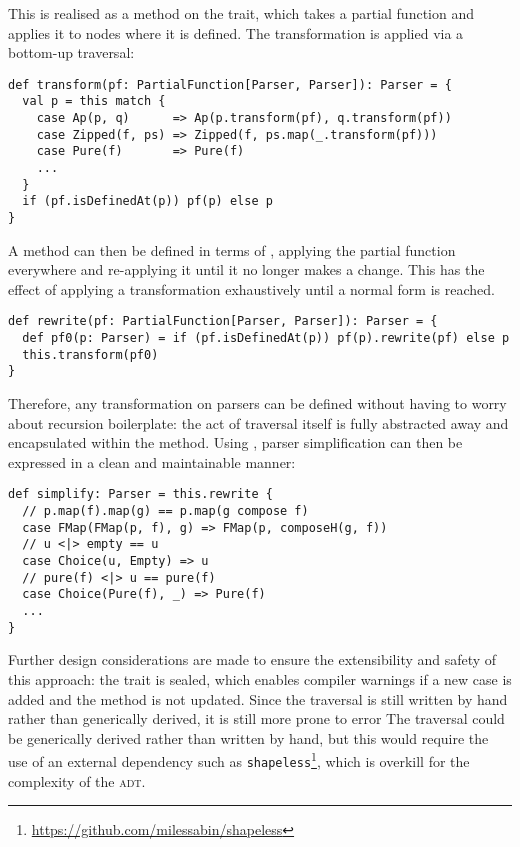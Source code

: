 \documentclass[../../../main.tex]{subfiles}
\begin{document}
This is realised as a  method on the  trait, which takes a partial function and applies it to nodes where it is defined.
The transformation is applied via a bottom-up traversal:
\begin{verbatim}
def transform(pf: PartialFunction[Parser, Parser]): Parser = {
  val p = this match {
    case Ap(p, q)      => Ap(p.transform(pf), q.transform(pf))
    case Zipped(f, ps) => Zipped(f, ps.map(_.transform(pf)))
    case Pure(f)       => Pure(f)
    ...
  }
  if (pf.isDefinedAt(p)) pf(p) else p
}
\end{verbatim}
%
A  method can then be defined in terms of , applying the partial function everywhere and re-applying it until it no longer makes a change.
This has the effect of applying a transformation exhaustively until a normal form is reached.
\begin{verbatim}
def rewrite(pf: PartialFunction[Parser, Parser]): Parser = {
  def pf0(p: Parser) = if (pf.isDefinedAt(p)) pf(p).rewrite(pf) else p
  this.transform(pf0)
}
\end{verbatim}
%
Therefore, any transformation on parsers can be defined without having to worry about recursion boilerplate: the act of traversal itself is fully abstracted away and encapsulated within the  method.
Using , parser simplification can then be expressed in a clean and maintainable manner:
\begin{verbatim}
def simplify: Parser = this.rewrite {
  // p.map(f).map(g) == p.map(g compose f)
  case FMap(FMap(p, f), g) => FMap(p, composeH(g, f))
  // u <|> empty == u
  case Choice(u, Empty) => u
  // pure(f) <|> u == pure(f)
  case Choice(Pure(f), _) => Pure(f)
  ...
}
\end{verbatim}
%
Further design considerations are made to ensure the extensibility and safety of this approach: the  trait is sealed, which enables compiler warnings if a new  case is added and the  method is not updated.
Since the traversal is still written by hand rather than generically derived, it is still more prone to error
The traversal could be generically derived rather than written by hand, but this would require the use of an external dependency such as \texttt{shapeless}\footnote{\url{https://github.com/milessabin/shapeless}},
which is overkill for the complexity of the  \textsc{adt}.
\end{document}
